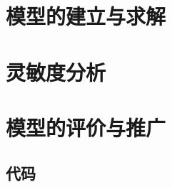 \documentclass{cumcmthesis}
\begin{document}
\section{模型的建立与求解}

\section{灵敏度分析}

\section{模型的评价与推广}

\begin{thebibliography}{99}%


\end{thebibliography}

\begin{appendices}

\section{代码}
%
\end{appendices}
\end{document}

